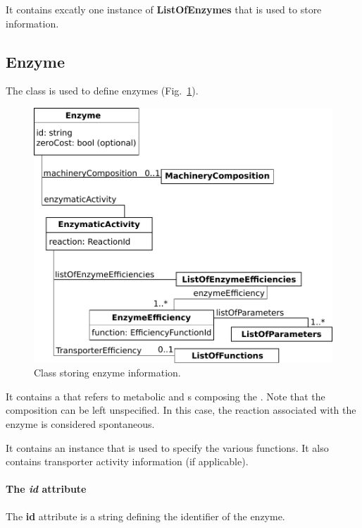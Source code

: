 It contains excatly one instance of \textbf{ListOfEnzymes} that is used
to store \enzyme{} information.


\subsection{Enzyme}
\label{sec:enzyme}

The \enzyme{} class is used to define enzymes
(Fig.~\ref{fig:enzymes_enzyme}).

\begin{figure}
  \centering
  \includegraphics[scale=0.8]{figures/enzymes_enzyme}
  \caption{Class storing enzyme information.}
\label{fig:enzymes_enzyme}
\end{figure}

It contains a \machinerycomposition{} that refers to metabolic \species{}
and \macromolecule{}s composing the \enzyme{}.
Note that the composition can be left unspecified.
In this case, the reaction associated with the enzyme is considered spontaneous.

It contains an \enzymaticactivity{} instance that is used to specify
the various \enzymeefficiency{} functions.
It also contains transporter activity information (if applicable).

\paragraph{The \textit{id} attribute}
The \textbf{id} attribute is a string defining the identifier of
the enzyme.

